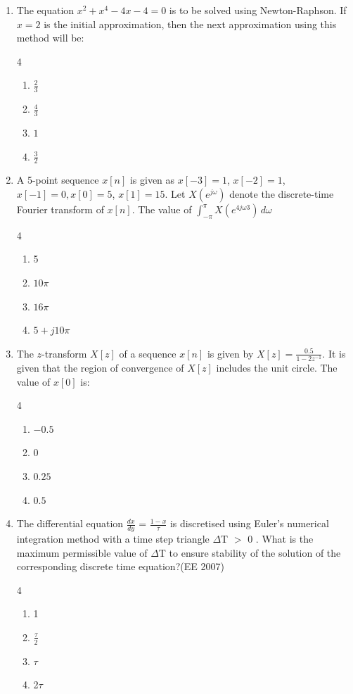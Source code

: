 \begin{enumerate}[label=\thesubsection.\arabic*,ref=\thesubsection.\theenumi]
\item The equation $x^2 + x^4 - 4x - 4 = 0$ is to be solved using Newton-Raphson. If $x = 2$ is the initial approximation, then the next approximation using this method will be:
\hfill{}

\begin{multicols}{4}
\begin{enumerate}
    \item $\frac{2}{3}$
    \item $\frac{4}{3}$
    \item $1$
    \item $\frac{3}{2}$   
\end{enumerate}
\end{multicols}
\item
A 5-point sequence $x[n]$ is given as $x[-3]=1$, $x[-2]=1$, $x[-1]=0,
x[0]=5$, $x[1]=15$. Let $X\left(e^{j\omega}\right)$ denote the discrete-time Fourier
transform of $x[n]$. The value of
$
\int_{-\pi}^{\pi} X\left(e^{4j\omega3}\right)\, d\omega
$
\hfill{}
\begin{multicols}{4}
\begin{enumerate}
  \item 5
  \item $10\pi$
  \item $16\pi$
  \item $5 + j10\pi$
\end{enumerate}
\end{multicols}

\item The $z$-transform $X[z]$ of a sequence $x[n]$ is given by
$
X[z]=\frac{0.5}{1-2z^{-1}}.
$
It is given that the region of convergence of $X[z]$ includes the unit circle. The value of $x[0]$ is: 
\hfill{}
\begin{multicols}{4}
\begin{enumerate}
    \item $-0.5$
    \item $0$
    \item $0.25$
    \item $0.5$
\end{enumerate}
\end{multicols}

\item  The differential equation $\frac{dx}{dy}$ = $\frac{1-x}{\tau}$ is discretised using Euler's numerical integration method with a time step triangle $\Delta$T $>$  0 . What is the maximum permissible value of $\Delta$T to ensure stability of the solution of the corresponding discrete time equation?\hfill{(EE 2007)} 
\begin{multicols}{4}
\begin{enumerate}
 \item 1
\item $\frac{\tau}{2}$
\item $\tau$
\item 2$\tau$
\end{enumerate}
\end{multicols}


\end{enumerate}
